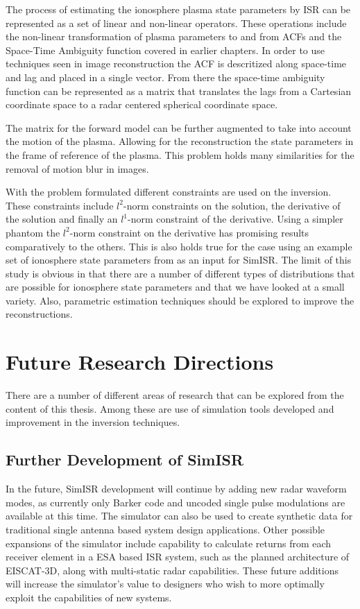 The process of estimating the ionosphere plasma state parameters by ISR can be represented as a set of linear and non-linear operators. These operations include the non-linear transformation of plasma parameters to and from ACFs and the Space-Time Ambiguity function covered in earlier chapters. In order to use techniques seen in image reconstruction the ACF is descritized along space-time and lag and placed in a single vector. From there the space-time ambiguity function can be represented as a matrix that translates the lags from a Cartesian coordinate space to a radar centered spherical coordinate space. 

The matrix for the forward model can be further augmented to take into account the motion of the plasma. Allowing for the reconstruction the state parameters in the frame of reference of the plasma. This problem holds many similarities for the removal of motion blur in images.

With the problem formulated different constraints are used on the inversion. These constraints include $l^2$-norm constraints on the solution, the derivative of the solution and finally an $l^1$-norm constraint of the derivative. Using a simpler phantom the $l^2$-norm constraint on the derivative has promising results comparatively to the others. This is also holds true for the case using an example set of ionosphere state parameters from \cite{Perry:2015jf} as an input for SimISR. The limit of this study is obvious in that there are a number of different types of distributions that are possible for ionosphere state parameters and that we have looked at a small variety. Also, parametric estimation techniques should be explored to improve the reconstructions. 

\section{Future Research Directions}

There are a number of different areas of research that can be explored from the content of this thesis. Among these are use of simulation tools developed and improvement in the inversion techniques.


\subsection{Further Development of SimISR}

In the future, SimISR development will continue by adding new radar waveform modes, as currently only Barker code and uncoded single pulse modulations are available at this time. The simulator can also be used to create synthetic data for traditional single antenna based system design applications. Other possible expansions of the simulator include capability to calculate returns from each receiver element in a ESA based ISR system, such as the planned architecture of EISCAT-3D, along with multi-static radar capabilities. These future additions will increase the simulator's value to designers who wish to more optimally exploit the capabilities of new systems. 

